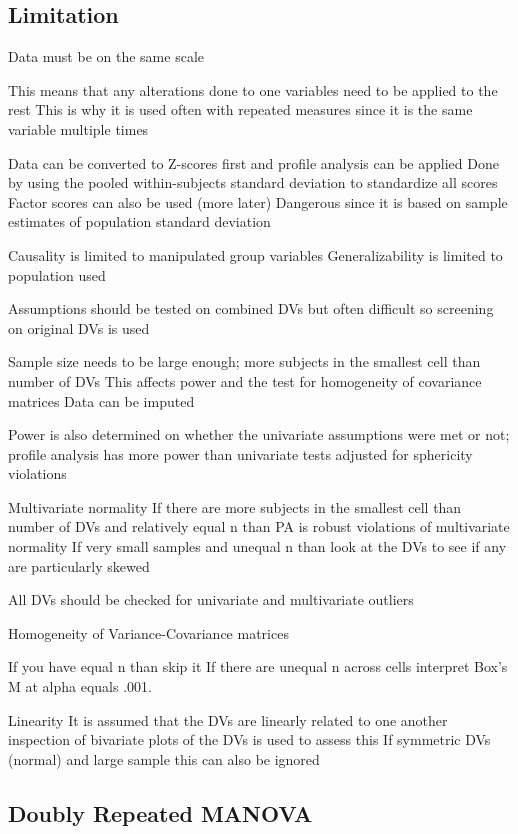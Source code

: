 \documentclass[]{book}
\theoremstyle{definition}
\theoremstyle{definition}
\theoremstyle{definition}
\theoremstyle{remark}
\begin{document}
\subsection{Limitation}\label{limitation}

Data must be on the same scale

This means that any alterations done to one variables need to be applied
to the rest This is why it is used often with repeated measures since it
is the same variable multiple times

Data can be converted to Z-scores first and profile analysis can be
applied Done by using the pooled within-subjects standard deviation to
standardize all scores Factor scores can also be used (more later)
Dangerous since it is based on sample estimates of population standard
deviation

Causality is limited to manipulated group variables Generalizability is
limited to population used

Assumptions should be tested on combined DVs but often difficult so
screening on original DVs is used

Sample size needs to be large enough; more subjects in the smallest cell
than number of DVs This affects power and the test for homogeneity of
covariance matrices Data can be imputed

Power is also determined on whether the univariate assumptions were met
or not; profile analysis has more power than univariate tests adjusted
for sphericity violations

Multivariate normality If there are more subjects in the smallest cell
than number of DVs and relatively equal n than PA is robust violations
of multivariate normality If very small samples and unequal n than look
at the DVs to see if any are particularly skewed

All DVs should be checked for univariate and multivariate outliers

Homogeneity of Variance-Covariance matrices

If you have equal n than skip it If there are unequal n across cells
interpret Box's M at alpha equals .001.

Linearity It is assumed that the DVs are linearly related to one another
inspection of bivariate plots of the DVs is used to assess this If
symmetric DVs (normal) and large sample this can also be ignored

\subsection{Doubly Repeated MANOVA}\label{doubly-repeated-manova}
\end{document}
